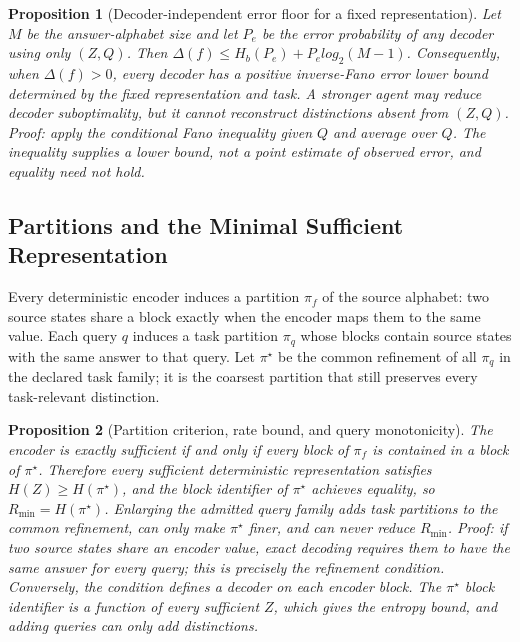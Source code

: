 \documentclass[11pt]{article}
\newtheorem{proposition}{Proposition}
\begin{document}
\begin{proposition}[Decoder-independent error floor for a fixed representation]
Let $M$ be the answer-alphabet size and let $P_e$ be the error probability of any decoder using only $(Z,Q)$. Then $\Delta(f)\leq H_b(P_e)+P_e log_2(M-1)$. Consequently, when $\Delta(f)>0$, every decoder has a positive inverse-Fano error lower bound determined by the fixed representation and task. A stronger agent may reduce decoder suboptimality, but it cannot reconstruct distinctions absent from $(Z,Q)$. Proof: apply the conditional Fano inequality given $Q$ and average over $Q$. The inequality supplies a lower bound, not a point estimate of observed error, and equality need not hold.
\end{proposition}

\subsection{Partitions and the Minimal Sufficient Representation}

Every deterministic encoder induces a partition $\pi_f$ of the source alphabet: two source states share a block exactly when the encoder maps them to the same value. Each query $q$ induces a task partition $\pi_q$ whose blocks contain source states with the same answer to that query. Let $\pi^\star$ be the common refinement of all $\pi_q$ in the declared task family; it is the coarsest partition that still preserves every task-relevant distinction.

\begin{proposition}[Partition criterion, rate bound, and query monotonicity]
The encoder is exactly sufficient if and only if every block of $\pi_f$ is contained in a block of $\pi^\star$. Therefore every sufficient deterministic representation satisfies $H(Z)\geq H(\pi^\star)$, and the block identifier of $\pi^\star$ achieves equality, so $R_{\min}=H(\pi^\star)$. Enlarging the admitted query family adds task partitions to the common refinement, can only make $\pi^\star$ finer, and can never reduce $R_{\min}$. Proof: if two source states share an encoder value, exact decoding requires them to have the same answer for every query; this is precisely the refinement condition. Conversely, the condition defines a decoder on each encoder block. The $\pi^\star$ block identifier is a function of every sufficient $Z$, which gives the entropy bound, and adding queries can only add distinctions.
\end{proposition}
\end{document}
